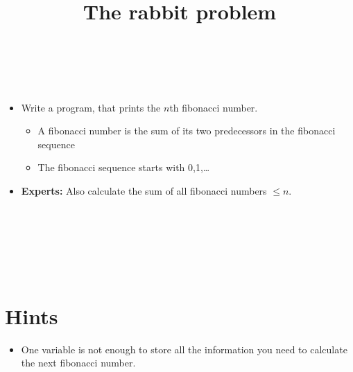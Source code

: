 


\title{The rabbit problem} %
\author{} %
\renewcommand{\difficulty}{Hard} %
\renewcommand{\requirements}{Variables, input/output, loops} %
\renewcommand{\aims}{More looping} %


 \maketitle
 \taskinfos

\ \\\ \\
\begin{itemize}
	\item Write a program, that prints the $n$th fibonacci number.
	\begin{itemize}
		\item A fibonacci number is the sum of its two predecessors in the fibonacci sequence
		\item The fibonacci sequence starts with 0,1,\dots
	\end{itemize}
	\item \textbf{Experts:} Also calculate the sum of all fibonacci numbers $\leq n$.
\end{itemize}	
 
 
\ \\\ \\\ \\\ \\\ \\
\section*{Hints}
	\begin{itemize}
		\item One variable is not enough to store all the information you need to calculate the next fibonacci number.
	\end{itemize}
 

